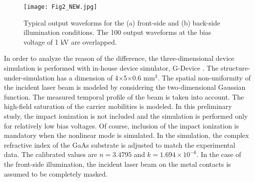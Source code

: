 \documentclass[final,5p,times,twocolumn]{elsarticle}
\newcommand{\revision}[1]{{#1}}
\begin{document}
\begin{figure}[!t]
\centering
\texttt{[image: Fig2\_NEW.jpg]}
\caption{
Typical output waveforms for the (a) front-side and (b) back-side illumination conditions. 
The 100 output waveforms at the bias voltage of 1 kV are overlapped.
}
\label{fig_wave}
\end{figure}   

   In order to analyze the reason of the difference, the three-dimensional device simulation is performed with in-house device simulator, G-Device \cite{Hong2015,Hong2018}.
   The structure-under-simulation has a dimension of 4$\times$5$\times$0.6 mm$^3$.
   The spatial non-uniformity of the incident laser beam is modeled by considering the two-dimensional Gaussian function.
   The measured temporal profile of the beam is taken into account.
   The high-field saturation of the carrier mobilities is modeled.
   In this preliminary study, the impact ionization is not included and the simulation is performed only for relatively low bias voltages.   
\revision{
   Of course, inclusion of the impact ionization is mandatory when the nonlinear mode is simulated. 
}   
   In the simulation, the complex refractive index of the GaAs substrate \cite{Levinshtein1996} is adjusted to match the experimental data.
   The calibrated values are $n = 3.4795$ and $k = 1.694 \times 10^{-6}$.
   In the case of the front-side illumination, the incident laser beam on the metal contacts is assumed to be completely masked.

\end{document}
